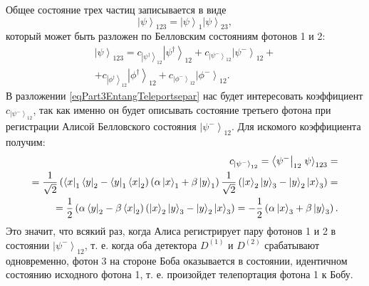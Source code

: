 Общее состояние трех частиц записывается в виде
\begin{equation}
  \left|\psi\right>_{123} = \left|\psi\right>_1 \left|\psi\right>_{23},
  \nonumber
\end{equation}
который может быть разложен по Белловским состояниям фотонов 1 и 2:
\begin{eqnarray}
\left|\psi\right>_{123} = 
c_{\left|\psi^{\dag}\right>_{12}}\left|\psi^{\dag}\right>_{12} +
c_{\left|\psi^{-}\right>_{12}}\left|\psi^{-}\right>_{12} +
\nonumber \\
+
c_{\left|\phi^{\dag}\right>_{12}}\left|\phi^{\dag}\right>_{12} +
c_{\left|\phi^{-}\right>_{12}}\left|\phi^{-}\right>_{12}.
\label{eqPart3EntangTeleportsepar}
\end{eqnarray}
В разложении \eqref{eqPart3EntangTeleportsepar} нас будет интересовать
коэффициент 
$c_{\left|\psi^{-}\right>_{12}}$, так как именно он будет описывать
состояние третьего фотона при регистрации Алисой Белловского состояния 
$\left|\psi^{-}\right>_{12}$. Для искомого коэффициента получим:
\begin{eqnarray}
  c_{\left|\psi^{-}\right>_{12}} = 
  \left<\psi^{-}\right|_{12} \left.\psi\right>_{123} = 
  \nonumber \\
  =
  \frac{1}{\sqrt{2}}
  \left(
  \bra{x}_1\bra{y}_2 - 
  \bra{y}_1\bra{x}_2
  \right)
  \left(
  \alpha \ket{x}_1 +
  \beta \ket{y}_1
  \right)
  \frac{1}{\sqrt{2}}
  \left(
  \ket{x}_2\ket{y}_3 - 
  \ket{y}_2\ket{x}_3
  \right) = 
  \nonumber \\
  = \frac{1}{2}
  \left(
  \alpha\bra{y}_2 - 
  \beta\bra{x}_2
  \right)
  \left(
  \ket{x}_2\ket{y}_3 - 
  \ket{y}_2\ket{x}_3
  \right) = 
  - \frac{1}{2}  
  \left(
  \alpha \ket{x}_3 +
  \beta \ket{y}_3
  \right).
\nonumber
\end{eqnarray}
Это значит, что всякий раз, когда Алиса регистрирует пару фотонов 1 и 2
в состоянии $\left|\psi^{-}\right>_{12}$, т. е. когда оба детектора
$D^{(1)}$ и $D^{(2)}$ срабатывают одновременно, фотон 3 на стороне
Боба оказывается в состоянии, идентичном состоянию исходного фотона 1,
т. е. произойдет телепортация фотона 1  к Бобу.


